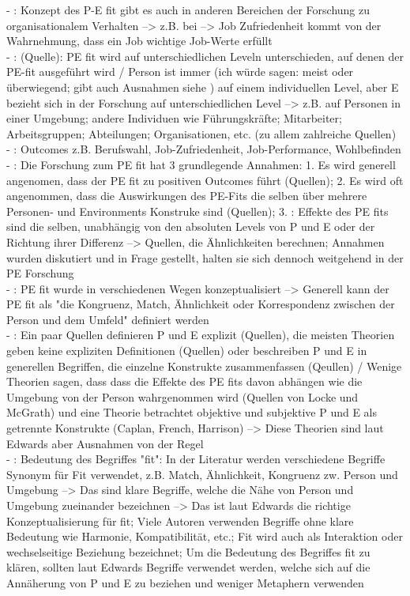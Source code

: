 - \cite[S. 3]{edwards:1990}: Konzept des P-E fit gibt es auch in anderen Bereichen der Forschung zu organisationalem Verhalten --> z.B. bei \textcite{locke:1969} --> Job Zufriedenheit kommt von der Wahrnehmung, dass ein Job wichtige Job-Werte erfüllt \\
- \cite[S. 5f.]{edwards:2007}: (Quelle): PE fit wird auf unterschiedlichen Leveln unterschieden, auf denen der PE-fit ausgeführt wird / Person ist immer (ich würde sagen: meist oder überwiegend; gibt auch Ausnahmen siehe \cite[S. 6]{edwards:2007}) auf einem individuellen Level, aber E bezieht sich in der Forschung auf unterschiedlichen Level --> z.B. auf Personen in einer Umgebung; andere Individuen wie Führungskräfte; Mitarbeiter; Arbeitsgruppen; Abteilungen; Organisationen, etc. (zu allem zahlreiche Quellen) \\
- \cite[S. 1]{edwards:2007}: Outcomes z.B. Berufswahl, Job-Zufriedenheit, Job-Performance, Wohlbefinden \\
- \cite[S. 1f.]{edwards:2007}: Die Forschung zum PE fit hat 3 grundlegende Annahmen: 1. Es wird generell angenomen, dass der PE fit zu positiven Outcomes führt (Quellen); 2. Es wird oft angenommen, dass die Auswirkungen des PE-Fits die selben über mehrere Personen- und Environments Konstruke sind (Quellen); 3. \cite[S. 2]{edwards:2007}: Effekte des PE fits sind die selben, unabhängig von den absoluten Levels von P und E oder der Richtung ihrer Differenz --> Quellen, die Ähnlichkeiten berechnen; Annahmen wurden diskutiert und in Frage gestellt, halten sie sich dennoch weitgehend in der PE Forschung \\ 
- \cite[S. 3]{edwards:2007}: PE fit wurde in verschiedenen Wegen konzeptualisiert --> Generell kann der PE fit als "die Kongruenz, Match, Ähnlichkeit oder Korrespondenz zwischen der Person und dem Umfeld" definiert werden\\
- \cite[S. 49]{edwards:2008}: Ein paar Quellen definieren P und E explizit (Quellen), die meisten Theorien geben keine expliziten Definitionen (Quellen) oder beschreiben P und E in generellen Begriffen, die einzelne Konstrukte zusammenfassen (Qeullen) / Wenige Theorien sagen, dass dass die Effekte des PE fits davon abhängen wie die Umgebung von der Person wahrgenommen wird (Quellen von Locke und McGrath) und eine Theorie betrachtet objektive und subjektive P und E als getrennte Konstrukte (Caplan, French, Harrison) --> Diese Theorien sind laut Edwards aber Ausnahmen von der Regel \\
- \cite[S. 53]{edwards:2008}: Bedeutung des Begriffes "fit": In der Literatur werden verschiedene Begriffe Synonym für Fit verwendet, z.B. Match, Ähnlichkeit, Kongruenz zw. Person und Umgebung --> Das sind klare Begriffe, welche die Nähe von Person und Umgebung zueinander bezeichnen --> Das ist laut Edwards die richtige Konzeptualisierung für fit; Viele Autoren verwenden Begriffe ohne klare Bedeutung wie Harmonie, Kompatibilität, etc.; Fit wird auch als Interaktion oder wechselseitige Beziehung bezeichnet; Um die Bedeutung des Begriffes fit zu klären, sollten laut Edwards Begriffe verwendet werden, welche sich auf die Annäherung von P und E zu beziehen und weniger Metaphern verwenden \\
